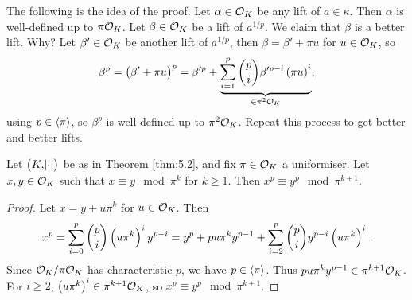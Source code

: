 The following is the idea of the proof. Let $ \alpha \in \mathcal{O}_K $ be any lift of $ a \in \kappa $. Then $ \alpha $ is well-defined up to $ \pi\mathcal{O}_K $. Let $ \beta \in \mathcal{O}_K $ be a lift of $ a^{1 / p} $. We claim that $ \beta $ is a better lift. Why? Let $ \beta' \in \mathcal{O}_K $ be another lift of $ a^{1 / p} $, then $ \beta = \beta' + \pi u $ for $ u \in \mathcal{O}_K $, so
$$ \beta^p = \br{\beta' + \pi u}^p = \beta'^p + \underbrace{\sum_{i = 1}^p \binom{p}{i}\beta'^{p - i}\br{\pi u}^i}_{\in \pi^2\OOO_K}, $$
using $ p \in \left\langle \pi \right\rangle $, so $ \beta^p $ is well-defined up to $ \pi^2\mathcal{O}_K $. Repeat this process to get better and better lifts.

\begin{lemma}
\label{lem:5.4}
Let $ \br{K, \abs{\cdot}} $ be as in Theorem \ref{thm:5.2}, and fix $ \pi \in \mathcal{O}_K $ a uniformiser. Let $ x, y \in \mathcal{O}_K $ such that $ x \equiv y \mod \pi^k $ for $ k \ge 1 $. Then $ x^p \equiv y^p \mod \pi^{k + 1} $.
\end{lemma}

\begin{proof}
Let $ x = y + u\pi^k $ for $ u \in \mathcal{O}_K $. Then
$$ x^p = \sum_{i = 0}^p \binom{p}{i}\br{u\pi^k}^iy^{p - i} = y^p + pu\pi^ky^{p - 1} + \sum_{i = 2}^p \binom{p}{i}y^{p - i}\br{u\pi^k}^i. $$
Since $ \mathcal{O}_K / \pi\mathcal{O}_K $ has characteristic $ p $, we have $ p \in \left\langle \pi \right\rangle $. Thus $ pu\pi^ky^{p - 1} \in \pi^{k + 1}\mathcal{O}_K $. For $ i \ge 2 $, $ \br{u\pi^k}^i \in \pi^{k + 1}\OOO_K $, so $ x^p \equiv y^p \mod \pi^{k + 1} $.
\end{proof}

